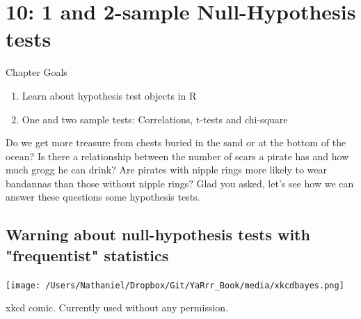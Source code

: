 \documentclass{tufte-book}\usepackage[]{graphicx}\usepackage[]{color}
\makeatletter
\newenvironment{kframe}{%
 \def\at@end@of@kframe{}%
 \ifinner\ifhmode%
  \def\at@end@of@kframe{\end{minipage}}%
  \begin{minipage}{\columnwidth}%
 \fi\fi%
 \def\FrameCommand##1{\hskip\@totalleftmargin \hskip-\fboxsep
 \colorbox{shadecolor}{##1}\hskip-\fboxsep
     \hskip-\linewidth \hskip-\@totalleftmargin \hskip\columnwidth}%
 \MakeFramed {\advance\hsize-\width
   \@totalleftmargin\z@ \linewidth\hsize
   \@setminipage}}%
 {\par\unskip\endMakeFramed%
 \at@end@of@kframe}
\newenvironment{knitrout}{}{} %
\makeatother
\begin{document}
\begin{footnotesize}
\begin{footnotesize}
\begin{knitrout}
\begin{kframe}
{\ttfamily\noindent\bfseries\color{errorcolor}{\#\# Error in head(hsurvey): object 'hsurvey' not found}}\end{kframe}
\end{knitrout}
\end{footnotesize}





\chapter{10: 1 and 2-sample Null-Hypothesis tests}
\label{ch:10}


Chapter Goals

\begin{enumerate}
  \item Learn about hypothesis test objects in R
  \item One and two sample tests: Correlations, t-tests and chi-square
\end{enumerate}

Do we get more treasure from chests buried in the sand or at the bottom of the ocean? Is there a relationship between the number of scars a pirate has and how much grogg he can drink? Are pirates with nipple rings more likely to wear bandannas than those without nipple rings? Glad you asked, let's see how we can answer these questions some hypothesis tests.

\section{Warning about null-hypothesis tests with "frequentist" statistics}

\begin{marginfigure}
\texttt{[image: /Users/Nathaniel/Dropbox/Git/YaRrr\_Book/media/xkcdbayes.png]}
\caption{xkcd comic. Currently used without any permission.}
\label{fig:xkcdbayes}
\end{marginfigure}


\end{footnotesize}
\end{document}
